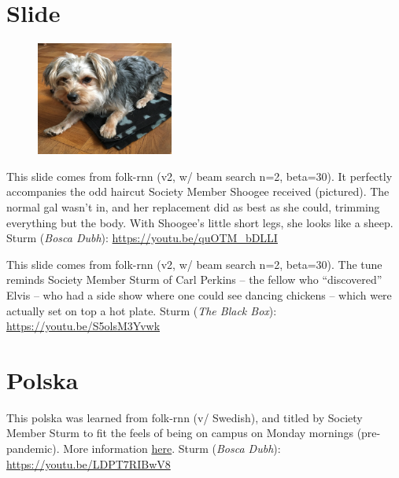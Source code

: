 \documentclass[a4paper,notitlepage,twoside]{book}
\begin{document}
\section{Slide}
{}  
\hypertarget{slide:SheepDog}{}
\begin{figure}
\vspace{-0.3in}
\includegraphics[width=0.4\textwidth]{sheepdog.JPG}
\end{figure}
This slide comes from folk-rnn (v2, w/ beam search n=2, beta=30). 
It perfectly accompanies the odd haircut Society Member Shoogee received (pictured). 
The normal gal wasn't in, and her replacement did as best as she could, trimming everything but the body. With Shoogee's little short legs, she looks like a sheep.
Sturm ({\em Bosca Dubh}): \url{https://youtu.be/quOTM_bDLLI}

\clearpage
{}
{}  
\hypertarget{slide:ChickensDancing}{}
This slide comes from folk-rnn (v2, w/ beam search n=2, beta=30). 
The tune reminds Society Member Sturm of Carl Perkins -- the fellow who
``discovered'' Elvis -- who had a side show where one could see
dancing chickens -- which were actually set on top a hot plate.
Sturm ({\em The Black Box}): \url{https://youtu.be/S5olsM3Yvwk}

\clearpage
\section{Polska}
{}  
\hypertarget{polska:MaandagpaaKTH}{}
This polska was learned from folk-rnn (v/ Swedish),
and titled by Society Member Sturm to fit the feels of being on campus 
on Monday mornings (pre-pandemic).
More information \href{https://themachinefolksession.org/tune/551}{here}.
Sturm ({\em Bosca Dubh}): \url{https://youtu.be/LDPT7RIBwV8}
\end{document}
